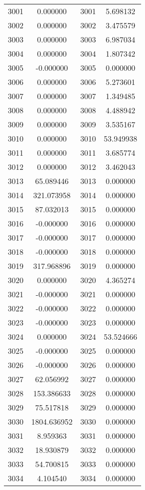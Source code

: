 \documentclass[12pt]{article}
\begin{document}
\begin{longtable}{@{}cccc@{}}
3001 & 0.000000 & 3001 & 5.698132 \\
3002 & 0.000000 & 3002 & 3.475579 \\
3003 & 0.000000 & 3003 & 6.987034 \\
3004 & 0.000000 & 3004 & 1.807342 \\
3005 & -0.000000 & 3005 & 0.000000 \\
3006 & 0.000000 & 3006 & 5.273601 \\
3007 & 0.000000 & 3007 & 1.349485 \\
3008 & 0.000000 & 3008 & 4.488942 \\
3009 & 0.000000 & 3009 & 3.535167 \\
3010 & 0.000000 & 3010 & 53.949938 \\
3011 & 0.000000 & 3011 & 3.685774 \\
3012 & 0.000000 & 3012 & 3.462043 \\
3013 & 65.089446 & 3013 & 0.000000 \\
3014 & 321.073958 & 3014 & 0.000000 \\
3015 & 87.032013 & 3015 & 0.000000 \\
3016 & -0.000000 & 3016 & 0.000000 \\
3017 & -0.000000 & 3017 & 0.000000 \\
3018 & -0.000000 & 3018 & 0.000000 \\
3019 & 317.968896 & 3019 & 0.000000 \\
3020 & 0.000000 & 3020 & 4.365274 \\
3021 & -0.000000 & 3021 & 0.000000 \\
3022 & -0.000000 & 3022 & 0.000000 \\
3023 & -0.000000 & 3023 & 0.000000 \\
3024 & 0.000000 & 3024 & 53.524666 \\
3025 & -0.000000 & 3025 & 0.000000 \\
3026 & -0.000000 & 3026 & 0.000000 \\
3027 & 62.056992 & 3027 & 0.000000 \\
3028 & 153.386633 & 3028 & 0.000000 \\
3029 & 75.517818 & 3029 & 0.000000 \\
3030 & 1804.636952 & 3030 & 0.000000 \\
3031 & 8.959363 & 3031 & 0.000000 \\
3032 & 18.930879 & 3032 & 0.000000 \\
3033 & 54.700815 & 3033 & 0.000000 \\
3034 & 4.104540 & 3034 & 0.000000 \\

\end{longtable}
\end{document}

